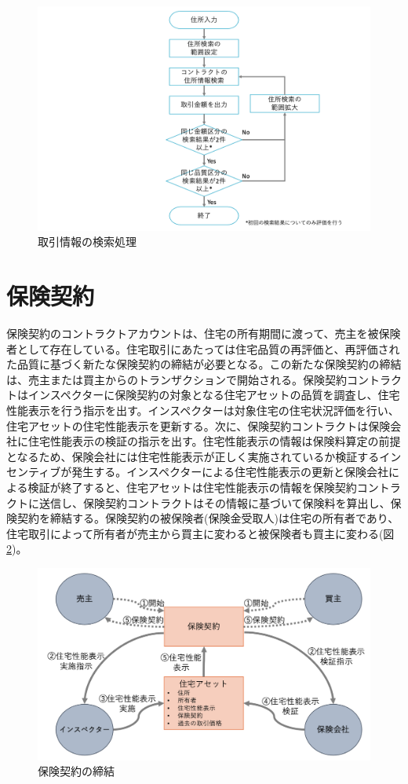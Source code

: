 \documentclass[a4paper,fontsize=11pt,report,notitlepage,line_length=38zw,number_of_lines=40,dvipdfmx]{jlreq}
\begin{document}
\begin{figure}
 \centering
 \includegraphics[width=12cm]{searchflow.png}
 \caption{取引情報の検索処理}
 \label{flow}
\end{figure}

\section{保険契約}
保険契約のコントラクトアカウントは、住宅の所有期間に渡って、売主を被保険者として存在している。住宅取引にあたっては住宅品質の再評価と、再評価された品質に基づく新たな保険契約の締結が必要となる。この新たな保険契約の締結は、売主または買主からのトランザクションで開始される。保険契約コントラクトはインスペクターに保険契約の対象となる住宅アセットの品質を調査し、住宅性能表示を行う指示を出す。インスペクターは対象住宅の住宅状況評価を行い、住宅アセットの住宅性能表示を更新する。次に、保険契約コントラクトは保険会社に住宅性能表示の検証の指示を出す。住宅性能表示の情報は保険料算定の前提となるため、保険会社には住宅性能表示が正しく実施されているか検証するインセンティブが発生する。インスペクターによる住宅性能表示の更新と保険会社による検証が終了すると、住宅アセットは住宅性能表示の情報を保険契約コントラクトに送信し、保険契約コントラクトはその情報に基づいて保険料を算出し、保険契約を締結する。保険契約の被保険者(保険金受取人)は住宅の所有者であり、住宅取引によって所有者が売主から買主に変わると被保険者も買主に変わる(図\ref{insurance})。

\begin{figure}
 \centering
 \includegraphics[width=12cm]{insurance.png}
 \caption{保険契約の締結}
 \label{insurance}
\end{figure}
\end{document}
